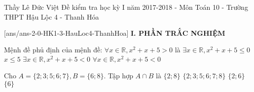 	\begin{name}
		{Thầy Lê Đức Việt}
		{Đề kiểm tra học kỳ I năm 2017-2018 - Môn Toán 10 - Trường THPT Hậu Lộc 4 - Thanh Hóa}
	\end{name}
	\setcounter{ex}{0}\setcounter{bt}{0}
	[ans/ans-2-0-HK1-3-HauLoc4-ThanhHoa]
\noindent\textbf{I. PHẦN TRẮC NGHIỆM}
\begin{ex}%
Mệnh đề phủ định của mệnh đề: $\forall x\in \mathbb{R} , x^2+x+5>0$ là 	
	\choice
	{\True $\exists x\in \mathbb{R}, x^2+x+5 \leq 0$}
	{$x \leq 5$}
	{$\exists x\in \mathbb{R}, x^2+x+5<0 $}
	{ $\forall x \in \mathbb{R}, x^2+x+5<0$}
\end{ex}

\begin{ex}%
Cho $A=\{2;3;5;6;7\}, B=\{6;8\}$. Tập hợp $A \cap B$ là
	\choice
	{$\{2;8\}$}
	{$\{2;3;5;6;7;8\}$}
	{$\{2;6\}$}
	{ \True $\{6\}$}
\end{ex}

